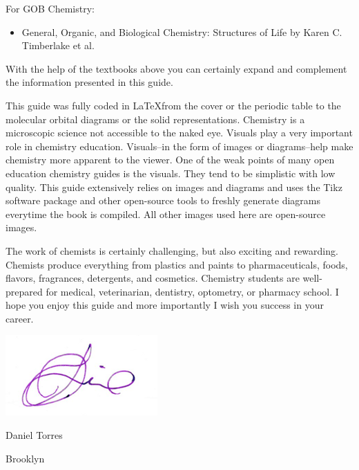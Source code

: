 \documentclass[main.tex]{subfiles}
\begin{document}
\begin{fullwidth}
\begin{multicols*}{2}
For GOB Chemistry:
\begin{small}\begin{itemize}[label=]
\setlength\itemsep{0.5em}\item General, Organic, and Biological Chemistry: Structures of Life by Karen C. Timberlake et al.
\end{itemize}\end{small}



With the help of the textbooks above you can certainly expand and complement the information presented in this guide.

This guide was fully coded in \LaTeX from the cover or the periodic table to the molecular orbital diagrams or the solid representations. Chemistry is a microscopic science not accessible to the naked eye. Visuals play a very important role in chemistry education. Visuals--in the form of images or diagrams--help make chemistry more apparent to the viewer. One of the weak points of many open education chemistry guides is the visuals. They tend to be simplistic with low quality. This guide extensively relies on images and diagrams and uses the Tikz software package and other open-source tools to freshly generate diagrams everytime the book is compiled. All other images used here are open-source images.

The work of chemists is certainly challenging, but also exciting and rewarding. Chemists produce everything from plastics and paints to pharmaceuticals, foods, flavors, fragrances, detergents, and cosmetics. Chemistry students are well-prepared for medical, veterinarian, dentistry, optometry, or pharmacy school. I hope you enjoy this guide and more importantly I wish you success in your career.  
\par \medskip
\includegraphics[height=4.5\baselineskip,]{./tothereader/signature} \par
Daniel Torres \par
Brooklyn
\end{multicols*}
\end{fullwidth}
\restoregeometry
\end{document}
